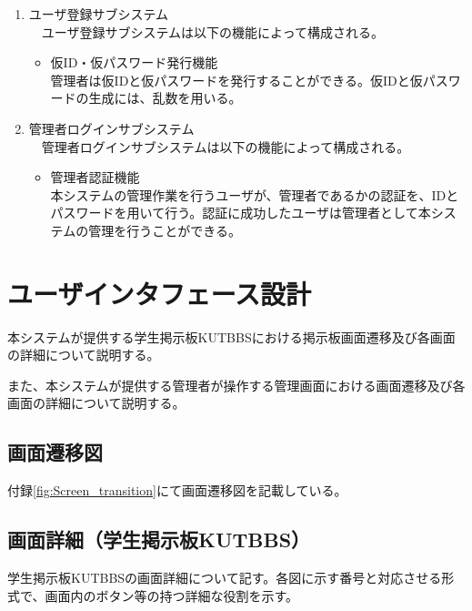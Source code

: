 \documentclass[a4j]{jarticle}
\begin{document}
\begin{enumerate}
  \item ユーザ登録サブシステム\\
  　ユーザ登録サブシステムは以下の機能によって構成される。
  \begin{itemize}
    \item 仮ID・仮パスワード発行機能\\
    管理者は仮IDと仮パスワードを発行することができる。仮IDと仮パスワードの生成には、乱数を用いる。\\
  \end{itemize}


  \item 管理者ログインサブシステム\\
  　管理者ログインサブシステムは以下の機能によって構成される。
  \begin{itemize}
    \item 管理者認証機能\\
    本システムの管理作業を行うユーザが、管理者であるかの認証を、IDとパスワードを用いて行う。認証に成功したユーザは管理者として本システムの管理を行うことができる。
  \end{itemize}

\end{enumerate}



\section{ユーザインタフェース設計}

本システムが提供する学生掲示板KUTBBSにおける掲示板画面遷移及び各画面の詳細について説明する。

また、本システムが提供する管理者が操作する管理画面における画面遷移及び各画面の詳細について説明する。

\subsection{画面遷移図}
付録\ref{fig:Screen_transition}にて画面遷移図を記載している。

\subsection{画面詳細（学生掲示板KUTBBS）}
学生掲示板KUTBBSの画面詳細について記す。各図に示す番号と対応させる形式で、画面内のボタン等の持つ詳細な役割を示す。
\end{document}
